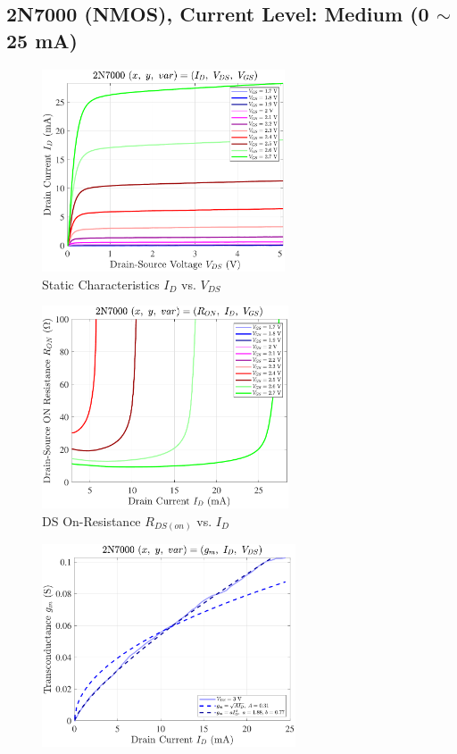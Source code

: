 \documentclass[UTF8]{article}
\begin{document}

\newpage
\subsection{2N7000 (NMOS), Current Level: Medium (0 $\sim$ 25 mA)}

\begin{center}
\noindent\begin{minipage}{0.45\columnwidth}
    \begin{figure}[H]\centering
        \includegraphics[height=170pt]{LCE-04-场效应管/assets/2N7000 (NMOS) [onsemi, KH32] current level mid (0~25mA)/2025-04-24_00-04-22__stc_Id_Vds_Vgs.pdf}
        \caption{Static Characteristics $I_D$ vs. $V_{DS}$}
    \end{figure}
    \begin{figure}[H]\centering
        \includegraphics[height=170pt]{LCE-04-场效应管/assets/2N7000 (NMOS) [onsemi, KH32] current level mid (0~25mA)/2025-04-24_00-00-07__stc_Ron_Id_Vgs.pdf}
        \caption{DS On-Resistance $R_{DS(on)}$ vs. $I_D$}
    \end{figure}
    \begin{figure}[H]\centering
        \includegraphics[height=170pt]{LCE-04-场效应管/assets/2N7000 (NMOS) [onsemi, KH32] current level mid (0~25mA)/2025-04-24_00-04-29__stc_gm_Id_Vds.pdf}

\end{figure}
\end{minipage}
\end{center}
\end{document}
